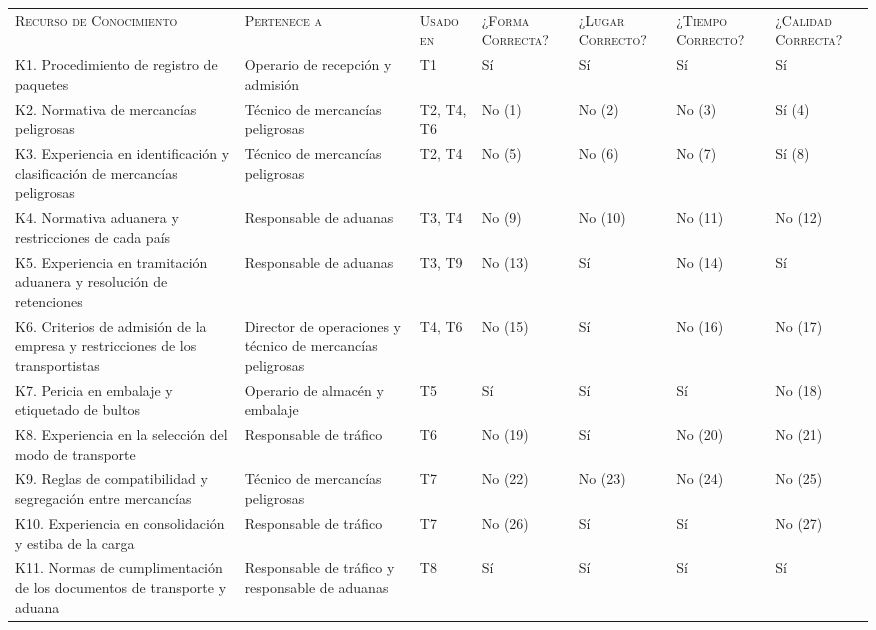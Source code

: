 \documentclass[12pt,a4paper,twoside,spanish]{article}      %
\newcommand{\PreserveBackslash}[1]{\let\temp=\\#1\let\\=\temp}
\let\PBS=\PreserveBackslash
\begin{document}
\begin{table}[H]
\scriptsize
\begin{tabularx}{\textwidth}{|>{\raggedright}p{3.1cm}|>{\raggedright}p{2.1cm}|>{\raggedright}p{1.1cm}|>{\centering}X|>{\centering}X|>{\centering}X|>{\PBS\centering}X|} \hline
\multicolumn{3}{|l}{\textbf{Modelo de Organización}} & \multicolumn{4}{|l|}{\textbf{Formulario OM-4: Activos de Conocimiento}} \\ \hline\hline
\textsc{Recurso de Conocimiento} & \textsc{Pertenece a} &  \textsc{Usado en} &  \textsc{¿Forma Correcta?} & \textsc{¿Lugar Correcto?} & \textsc{¿Tiempo Correcto?} & \textsc{¿Calidad Correcta?}\\ \hline
K1. Procedimiento de registro de paquetes & Operario de recepción y admisión & T1 & Sí & Sí & Sí & Sí \\ \hline
K2. Normativa de mercancías peligrosas & Técnico de mercancías peligrosas & T2, T4, T6 & No (1) & No (2) & No (3) & Sí (4) \\ \hline
K3. Experiencia en identificación y clasificación de mercancías peligrosas & Técnico de mercancías peligrosas & T2, T4 & No (5) & No (6) & No (7) & Sí (8) \\ \hline
K4. Normativa aduanera y restricciones de cada país & Responsable de aduanas & T3, T4 & No (9) & No (10) & No (11) & No (12) \\ \hline
K5. Experiencia en tramitación aduanera y resolución de retenciones & Responsable de aduanas & T3, T9 & No (13) & Sí & No (14) & Sí \\ \hline
K6. Criterios de admisión de la empresa y restricciones de los transportistas & Director de operaciones y técnico de mercancías peligrosas & T4, T6 & No (15) & Sí & No (16) & No (17) \\ \hline
K7. Pericia en embalaje y etiquetado de bultos & Operario de almacén y embalaje & T5 & Sí & Sí & Sí & No (18) \\ \hline
K8. Experiencia en la selección del modo de transporte & Responsable de tráfico & T6 & No (19) & Sí & No (20) & No (21) \\ \hline
K9. Reglas de compatibilidad y segregación entre mercancías & Técnico de mercancías peligrosas & T7 & No (22) & No (23) & No (24) & No (25) \\ \hline
K10. Experiencia en consolidación y estiba de la carga & Responsable de tráfico & T7 & No (26) & Sí & Sí & No (27) \\ \hline
K11. Normas de cumplimentación de los documentos de transporte y aduana & Responsable de tráfico y responsable de aduanas & T8 & Sí & Sí & Sí & Sí \\ \hline
\end{tabularx}
  \label{tab.OM4}
\end{table}
\end{document}
